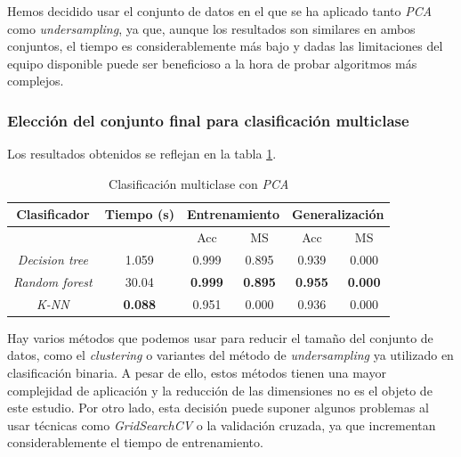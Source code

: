 Hemos decidido usar el conjunto de datos en el que se ha aplicado tanto \textit{PCA} como \textit{undersampling}, ya que, aunque los resultados son similares en ambos conjuntos, el tiempo es considerablemente más bajo y dadas las limitaciones del equipo disponible puede ser beneficioso a la hora de probar algoritmos más complejos.

\subsubsection{Elección del conjunto final para clasificación multiclase}
\label{subsubsec:eleccion_dataset_multi}

Los resultados obtenidos se reflejan en la tabla \ref{tabla:multi_pca}.

\begin{table}[th]
	\centering
	\begin{tabular}{ |c|c|c|c|c|c| }
		\hline
		\rowcolor{LightCyan}
		Clasificador & Tiempo (s) & \multicolumn{2}{c|}{Entrenamiento} & \multicolumn{2}{c|}{Generalización} \\
		\hline
		\rowcolor{LightCyan}
		& & Acc & MS & Acc & MS \\
		\hline
		\textit{Decision tree}  & 1.059          & 0.999          & 0.895          & 0.939          & 0.000          \\
		\textit{Random forest}  & 30.04          & \textbf{0.999} & \textbf{0.895} & \textbf{0.955} & \textbf{0.000} \\
		\textit{K-NN}           & \textbf{0.088} & 0.951          & 0.000          & 0.936          & 0.000          \\
		\hline
	\end{tabular}
	\caption{Clasificación multiclase con \textit{PCA}}
	\label{tabla:multi_pca}
\end{table}

\vspace{1em}

Hay varios métodos que podemos usar para reducir el tamaño del conjunto de datos, como el \textit{clustering} o variantes del método de \textit{undersampling} ya utilizado en clasificación binaria. A pesar de ello, estos métodos tienen una mayor complejidad de aplicación y la reducción de las dimensiones no es el objeto de este estudio. Por otro lado, esta decisión puede suponer algunos problemas al usar técnicas como \textit{GridSearchCV} o la validación cruzada, ya que incrementan considerablemente el tiempo de entrenamiento.

